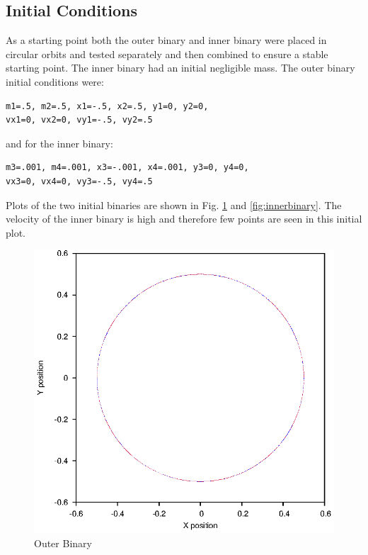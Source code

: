 \documentclass[a4paper,12pt]{article}
\begin{document}
\subsection{Initial Conditions}
As a starting point both the outer binary and inner binary were placed in circular orbits and tested separately and then combined to ensure a stable
starting point. The inner binary had an initial negligible mass.
The outer binary initial conditions were:
\begin{lstlisting}
m1=.5, m2=.5, x1=-.5, x2=.5, y1=0, y2=0,
vx1=0, vx2=0, vy1=-.5, vy2=.5
\end{lstlisting}
and for the inner binary:
\begin{lstlisting}
m3=.001, m4=.001, x3=-.001, x4=.001, y3=0, y4=0, 
vx3=0, vx4=0, vy3=-.5, vy4=.5
\end{lstlisting}
Plots of the two initial binaries are shown in Fig. \ref{fig:outerbinary} and 
\ref{fig:innerbinary}. The velocity of the inner binary is high and therefore few points are seen in this initial plot.
\begin{figure}[H]
\centering
\includegraphics[width=.9\textwidth]{./2016results/outerbinary/Orbit.eps}
\caption{Outer Binary}
\label{fig:outerbinary}
\end{figure}
\end{document}
